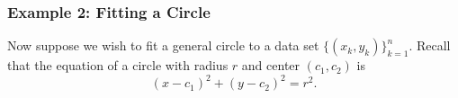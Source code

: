 %
%


\subsubsection*{Example 2: Fitting a Circle} %

Now suppose we wish to fit a general circle to a data set $\{(x_k, y_k)\}_{k=1}^n$. Recall that the equation of a circle with radius $r$ and center $(c_1,c_2)$ is
\begin{equation}
\label{circle}
(x-c_1)^2 + (y-c_2)^2 = r^2.
\end{equation}

